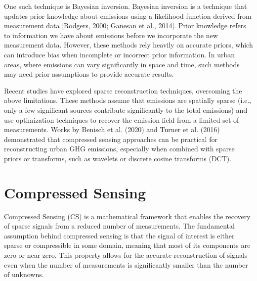 One such technique is Bayesian inversion.
Bayesian inversion is a technique that updates prior knowledge about emissions using a likelihood function derived from measurement data [Rodgers, 2000; Ganesan et al., 2014].
Prior knowledge refers to information we have about emissions before we incorporate the new measurement data.
However, these methods rely heavily on accurate priors, which can introduce bias when incomplete or incorrect prior information.
In urban areas, where emissions can vary significantly in space and time, such methods may need prior assumptions to provide accurate results.

Recent studies have explored sparse reconstruction techniques, overcoming the above limitations.
These methods assume that emissions are spatially sparse (i.e., only a few significant sources contribute significantly to the total emissions) and use optimization techniques to recover the emission field from a limited set of measurements.
Works by Benisch et al. (2020) and Turner et al. (2016) demonstrated that compressed sensing approaches can be practical for reconstructing urban GHG emissions, especially when combined with sparse priors or transforms, such as wavelets or discrete cosine transforms (DCT).


\section{Compressed Sensing}
Compressed Sensing (CS) is a mathematical framework that enables the recovery of sparse signals from a reduced number of measurements.
The fundamental assumption behind compressed sensing is that the signal of interest is either sparse or compressible in some domain, meaning that most of its components are zero or near zero.
This property allows for the accurate reconstruction of signals even when the number of measurements is significantly smaller than the number of unknowns.

